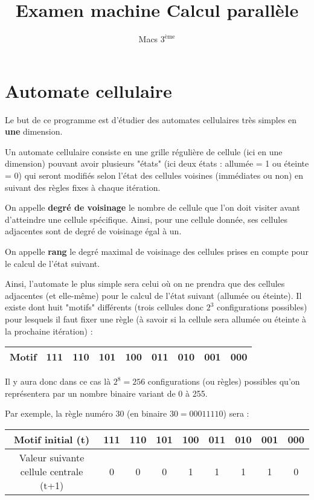 \documentclass[11pt]{article}
\title{Examen machine Calcul parallèle}
\author{Macs $3^{\mbox{ème}}$}
\begin{document}
\maketitle

\section{Automate cellulaire}

Le but de ce programme est d'étudier des automates cellulaires très simples en \textbf{une} dimension.

Un automate cellulaire consiste en une grille régulière de cellule (ici en une dimension) pouvant avoir plusieurs 
"états" (ici deux états : allumée = 1 ou éteinte = 0) qui seront modifiés selon l'état des cellules voisines 
(immédiates ou non) en suivant des règles fixes à chaque itération. 

On appelle \textbf{degré de voisinage} le nombre de cellule que l'on doit visiter avant d'atteindre une cellule spécifique.
Ainsi, pour une cellule donnée, ses cellules adjacentes sont de degré de voisinage égal à un.

On appelle \textbf{rang} le degré maximal de voisinage des cellules prises en compte pour le calcul de l'état suivant.

Ainsi, l'automate le plus simple sera celui où on ne prendra que des cellules adjacentes (et elle-même) pour le calcul de 
l'état suivant (allumée ou éteinte). Il existe dont huit "motifs" différents (trois cellules donc $2^{3}$ configurations possibles)
pour lesquels il faut fixer une règle (à savoir si la cellule sera allumée ou éteinte à la prochaine itération) :
\begin{center}
\begin{tabular}{|c||c|c|c|c|c|c|c|c|}\hline
Motif & 111 & 110 & 101 & 100 & 011 & 010 & 001 & 000 \\ \hline
\end{tabular}
\end{center}

Il y aura donc dans ce cas là $2^{8} = 256$ configurations (ou règles) possibles qu'on représentera par un nombre binaire variant de 0 à 255. 

Par exemple, la règle numéro 30 (en binaire $30 = 00011110$) sera :
\begin{center}
\begin{tabular}{|c||c|c|c|c|c|c|c|c|} \hline
Motif initial (t) & 111 & 110 & 101 & 100 & 011 & 010 & 001 & 000 \\ \hline
Valeur suivante cellule centrale (t+1) & 0 & 0 & 0 & 1 & 1 & 1 & 1 & 0 \\ \hline
\end{tabular}
\end{center}
\end{document}
